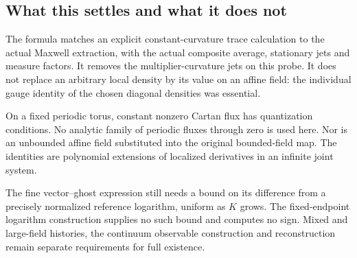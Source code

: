 \subsection{What this settles and what it does not}
\label{cdmom-scope}

The formula matches an explicit constant-curvature trace
calculation to the actual Maxwell extraction, with the
actual composite average, stationary jets and measure
factors. It removes the multiplier-curvature jets on
this probe. It does not replace an arbitrary local
density by its value on an affine field: the individual
gauge identity of the chosen diagonal densities was
essential.

On a fixed periodic torus, constant nonzero Cartan flux
has quantization conditions. No analytic family of
periodic fluxes through zero is used here. Nor is an
unbounded affine field substituted into the original
bounded-field map. The identities are polynomial
extensions of localized derivatives in an infinite
joint system.

The fine vector--ghost expression still needs a bound
on its difference from a precisely normalized reference
logarithm, uniform as \(K\) grows. The fixed-endpoint
logarithm construction supplies no such bound and
computes no sign. Mixed and large-field histories,
the continuum observable construction and reconstruction
remain separate requirements for full existence.
